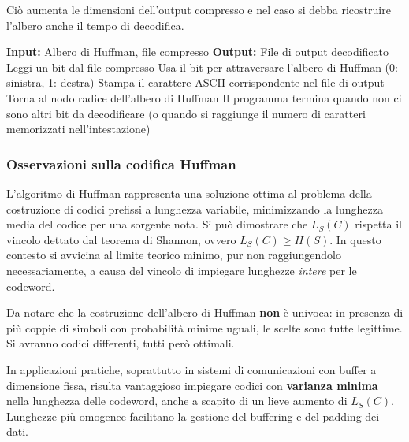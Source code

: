 Ciò aumenta le dimensioni dell'output compresso e nel caso si debba ricostruire l'albero anche il tempo di decodifica.

\begin{algorithm}
\caption{Decodifica Huffman}
\begin{algorithmic}[1]
\State \textbf{Input:} Albero di Huffman, file compresso
\State \textbf{Output:} File di output decodificato
\Statex
{}
    \State Leggi un bit dal file compresso
    \State Usa il bit per attraversare l'albero di Huffman (0: sinistra, 1: destra)
        \State Stampa il carattere ASCII corrispondente nel file di output
        \State Torna al nodo radice dell'albero di Huffman
    \EndIf
\EndWhile
\State Il programma termina quando non ci sono altri bit da decodificare 
\Statex {}\hspace{\algorithmicindent} (o quando si raggiunge il numero di caratteri memorizzati nell'intestazione)
\end{algorithmic}
\end{algorithm}

\subsubsection{Osservazioni sulla codifica Huffman}
L'algoritmo di Huffman rappresenta una soluzione ottima al problema della costruzione di codici prefissi a lunghezza variabile, minimizzando la lunghezza media del codice per una sorgente nota. Si può dimostrare che $L_S(C)$ rispetta il vincolo dettato dal teorema di Shannon, ovvero $L_S(C) \geq H(S)$.
In questo contesto si avvicina al limite teorico minimo, pur non raggiungendolo necessariamente, a causa del vincolo di impiegare lunghezze \textit{intere} per le codeword. 


Da notare che la costruzione dell'albero di Huffman \textbf{non} è univoca: in presenza di più coppie di simboli con probabilità minime uguali, le scelte sono tutte legittime. Si avranno codici differenti, tutti però ottimali.

In applicazioni pratiche, soprattutto in sistemi di comunicazioni con buffer a dimensione fissa, risulta vantaggioso impiegare codici con \textbf{varianza minima} nella lunghezza delle codeword, anche a scapito di un lieve aumento di $L_S(C)$. Lunghezze più omogenee facilitano la gestione del buffering e del padding dei dati.

